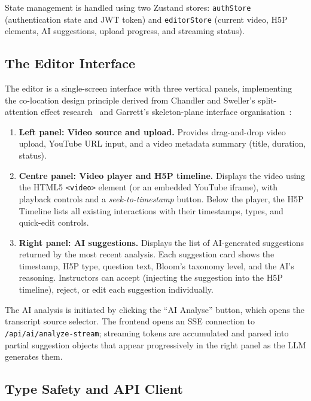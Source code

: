 State management is handled using two Zustand stores: \texttt{authStore}
(authentication state and JWT token) and \texttt{editorStore} (current video,
H5P elements, AI suggestions, upload progress, and streaming status).

\subsection{The Editor Interface}

The editor is a single-screen interface with three vertical panels,
implementing the co-location design principle derived from Chandler and
Sweller's split-attention effect research~\cite{chandler1991} and Garrett's
skeleton-plane interface organisation~\cite{garrett2010}:

\begin{enumerate}
  \item \textbf{Left panel: Video source and upload.} Provides drag-and-drop
  video upload, YouTube URL input, and a video metadata summary (title,
  duration, status).

  \item \textbf{Centre panel: Video player and H5P timeline.} Displays the
  video using the HTML5 \texttt{<video>} element (or an embedded YouTube
  iframe), with playback controls and a \emph{seek-to-timestamp} button.
  Below the player, the H5P Timeline lists all existing interactions with
  their timestamps, types, and quick-edit controls.

  \item \textbf{Right panel: AI suggestions.} Displays the list of AI-generated
  suggestions returned by the most recent analysis. Each suggestion card
  shows the timestamp, H5P type, question text, Bloom's taxonomy level,
  and the AI's reasoning. Instructors can accept (injecting the suggestion
  into the H5P timeline), reject, or edit each suggestion individually.
\end{enumerate}

The AI analysis is initiated by clicking the ``AI Analyse'' button, which
opens the transcript source selector. The frontend opens an SSE connection
to \texttt{/api/ai/analyze-stream}; streaming tokens are accumulated and
parsed into partial suggestion objects that appear progressively in the right
panel as the LLM generates them.

\subsection{Type Safety and API Client}


